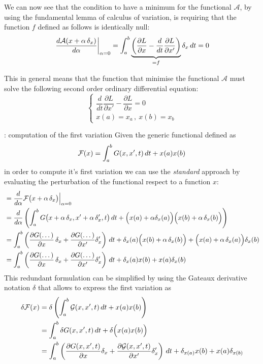 	We can now see that the condition to have a minimum for the functional $\mathcal A$, by using the fundamental lemma of calculus of variation, is requiring that the function $f$ defined as follows is identically null:
	\begin{equation} \label{eq:func:var1}
		\left. \frac{d\mathcal A(x+\alpha\, \delta_x)}{d\alpha} \right|_{\alpha = 0} = \int_a^b \underbrace{\left(\frac{\partial L }{\partial x} - \frac d{dt}\frac{\partial L }{\partial x'}\right)}_{=f} \delta_x \, dt = 0
	\end{equation}
	
	This in general means that the function that minimise the functional $\mathcal A$ must solve the following second order ordinary differential equation:
	\[ \begin{cases}
		\dfrac d{dt} \dfrac{\partial L }{\partial x'} - \dfrac {\partial L }{\partial x} = 0 \\ x(a) = x_a \, ,\ x(b) = x_b
	\end{cases} \]

	\begin{example}{: computation of the first variation}
		Given the generic functional defined as
		\[ \mathcal{F}(x) = \int_a^b G(x,x',t)\, dt + x(a)x(b) \]
		in order to compute it's first variation we can use the \textit{standard} approach by evaluating the perturbation of the functional respect to a function $x$:
		\begin{align*}
			&= \frac d{d\alpha} \mathcal F \big(x+\alpha\, \delta_x\big) \Big|_{\alpha=0} \\
			&= \frac{d}{d\alpha}\left( \int_a^b  G  \big(x+\alpha\, \delta_x, x' + \alpha\, \delta_x',t\big)\, dt  + \Big(x(a) + \alpha \delta_x(a)\Big)\Big(x(b) + \alpha\, \delta_x(b)\Big) \right) \\
			&=  \int_a^b \left( \frac{\partial  G  (\dots)}{\partial x} \, \delta_x + \frac{\partial  G  (\dots)}{\partial x'} \delta_x' \right) \, dt  + \delta_x(a) \Big(x(b) + \alpha\, \delta_x(b)\Big) + \Big( x(a) + \alpha\,\delta_x(a) \Big)\delta_x(b) \\
			&=  \int_a^b \left( \frac{\partial  G  (\dots)}{\partial x} \, \delta_x + \frac{\partial  G  (\dots)}{\partial x'} \delta_x' \right) \, dt  + \delta_x(a)x(b) + x(a)\delta_x(b)
		\end{align*}
		This redundant formulation can be simplified by using the Gateaux derivative notation $\delta$ that allows to express the first variation as
		\begin{align*}
			\delta \mathcal F(x) & = \delta \left(\int_a^b \mathcal{G}(x,x',t)\, dt + x(a)x(b)\right) \\
			&= \int_a^b \delta  G  (x,x',t)\, dt + \delta \Big(x(a) x(b) \Big)\\ 
			&= \int_a^b \left( \frac{\partial  G  (x,x',t)}{\partial x}\delta_x + \frac{\partial \mathcal G(x,x',t)}{\partial x'} \delta_x' \right)\, dt + \delta_{x(a)} x(b) + x(a)\delta_{x(b)}
		\end{align*}
	\end{example}
	
